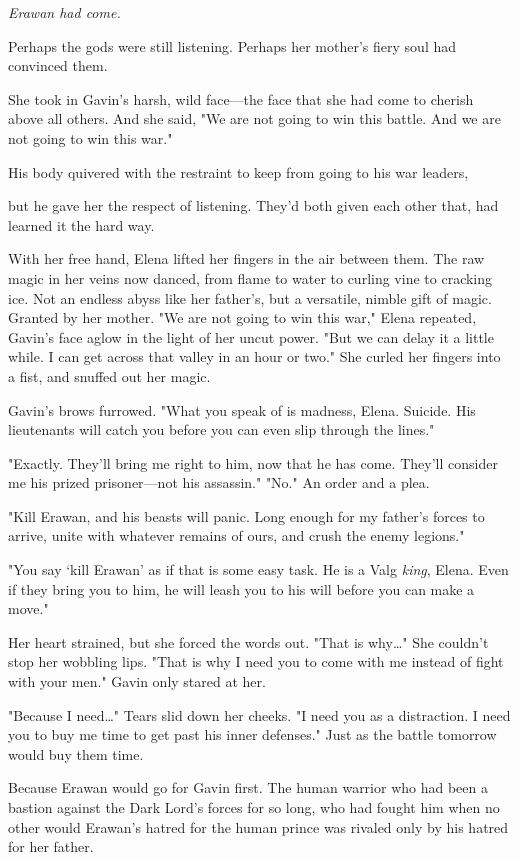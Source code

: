 \emph{Erawan had come.}

Perhaps the gods were still listening. Perhaps her mother's fiery soul had convinced them.

She took in Gavin's harsh, wild face---the face that she had come to cherish above all others. And she said, "We are not going to win this battle. And we are not going to win this war."

His body quivered with the restraint to keep from going to his war leaders,

but he gave her the respect of listening. They'd both given each other that, had learned it the hard way.

With her free hand, Elena lifted her fingers in the air between them. The raw magic in her veins now danced, from flame to water to curling vine to cracking ice. Not an endless abyss like her father's, but a versatile, nimble gift of magic. Granted by her mother. "We are not going to win this war," Elena repeated, Gavin's face aglow in the light of her uncut power. "But we can delay it a little while. I can get across that valley in an hour or two." She curled her fingers into a fist, and snuffed out her magic.

Gavin's brows furrowed. "What you speak of is madness, Elena. Suicide. His lieutenants will catch you before you can even slip through the lines."

"Exactly. They'll bring me right to him, now that he has come. They'll consider me his prized prisoner---not his assassin." "No." An order and a plea.

"Kill Erawan, and his beasts will panic. Long enough for my father's forces to arrive, unite with whatever remains of ours, and crush the enemy legions."

"You say `kill Erawan' as if that is some easy task. He is a Valg
\emph{king}, Elena. Even if they bring you to him, he will leash you to his will before you can make a move."

Her heart strained, but she forced the words out. "That is why\ldots" She couldn't stop her wobbling lips. "That is why I need you to come with me instead of fight with your men." Gavin only stared at her.

"Because I need\ldots" Tears slid down her cheeks. "I need you as a distraction. I need you to buy me time to get past his inner defenses." Just as the battle tomorrow would buy them time.

Because Erawan would go for Gavin first. The human warrior who had been a bastion against the Dark Lord's forces for so long, who had fought him when no other would  Erawan's hatred for the human prince was rivaled only by his hatred for her father.


